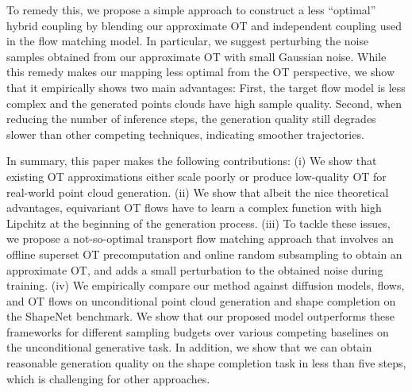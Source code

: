 To remedy this, we propose a simple approach to construct a less ``optimal'' hybrid coupling by blending our approximate OT and independent coupling used in the flow matching model.
%
In particular, we suggest perturbing the noise samples obtained from our approximate OT with small Gaussian noise.
%
While this remedy makes our mapping less optimal from the OT perspective, we show that it empirically shows two main advantages: 
First, the target flow model is less complex and the generated points clouds have high sample quality. 
Second, when reducing the number of inference steps, the generation quality still degrades slower than other competing techniques, indicating smoother trajectories.


In summary, this paper makes the following contributions: (i) We show that existing OT approximations either scale poorly or produce low-quality OT for real-world point cloud generation. 
%
(ii) We show that albeit the nice theoretical advantages, equivariant OT flows have to learn a complex function with high Lipchitz at the beginning of the generation process. 
%
(iii) To tackle these issues, we propose a not-so-optimal transport flow matching approach that involves an offline superset OT precomputation and online random subsampling to obtain an approximate OT, and adds a small perturbation to the obtained noise during training.
%
(iv) We empirically compare our method against diffusion models, flows, and OT flows on unconditional point cloud generation and shape completion on the ShapeNet benchmark. 
%
We show that our proposed model outperforms these frameworks for different sampling budgets over various competing baselines on the unconditional generative task.
%
In addition, we show that we can obtain reasonable generation quality on the shape completion task in less than five steps, which is challenging for other approaches.




